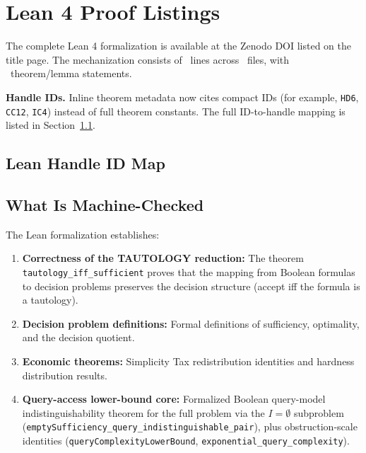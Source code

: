 \section{Lean 4 Proof Listings}\label{app:lean}

The complete Lean 4 formalization is available at the Zenodo DOI listed on the title page. The mechanization consists of \LeanTotalLines\ lines across \LeanTotalFiles\ files, with \LeanTotalTheorems\ theorem/lemma statements.

\noindent\textbf{Handle IDs.} Inline theorem metadata now cites compact IDs (for example, \texttt{HD6}, \texttt{CC12}, \texttt{IC4}) instead of full theorem constants. The full ID-to-handle mapping is listed in Section~\ref{sec:lean-handle-id-map}.

\subsection{Lean Handle ID Map}\label{sec:lean-handle-id-map}

\subsection{What Is Machine-Checked}

The Lean formalization establishes:

\begin{enumerate}
\item \textbf{Correctness of the TAUTOLOGY reduction:} The theorem \texttt{tautology\_iff\_sufficient} proves that the mapping from Boolean formulas to decision problems preserves the decision structure (accept iff the formula is a tautology).

\item \textbf{Decision problem definitions:} Formal definitions of sufficiency, optimality, and the decision quotient.

\item \textbf{Economic theorems:} Simplicity Tax redistribution identities and hardness distribution results.

\item \textbf{Query-access lower-bound core:} Formalized Boolean query-model indistinguishability theorem for the full problem via the $I=\emptyset$ subproblem (\texttt{emptySufficiency\_query\_indistinguishable\_pair}), plus obstruction-scale identities (\texttt{queryComplexityLowerBound}, \texttt{exponential\_query\_complexity}).
\end{enumerate}

